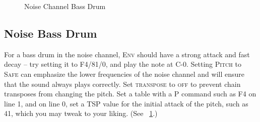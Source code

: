 \begin{figure}[hbtp]
	\centering
  \qquad

	\caption{Noise Channel Bass Drum}
	\label{fig:noisekick}
\end{figure}

\subsection{Noise Bass Drum}

For a bass drum in the noise channel, \textsc{Env} should have a strong attack and fast decay -- try setting it to F4/81/0, and play the note at C-0. Setting \textsc{Pitch} to \textsc{Safe} can emphasize the lower frequencies of the noise channel and will ensure that the sound always plays correctly. Set \textsc{transpose} to \textsc{off} to prevent chain transposes from changing the pitch. Set a table with a P command such as F4 on line 1, and on line 0, set a \textsc{TSP} value for the initial attack of the pitch, such as 41, which you may tweak to your liking. (See ~\ref{fig:noisekick}.)
